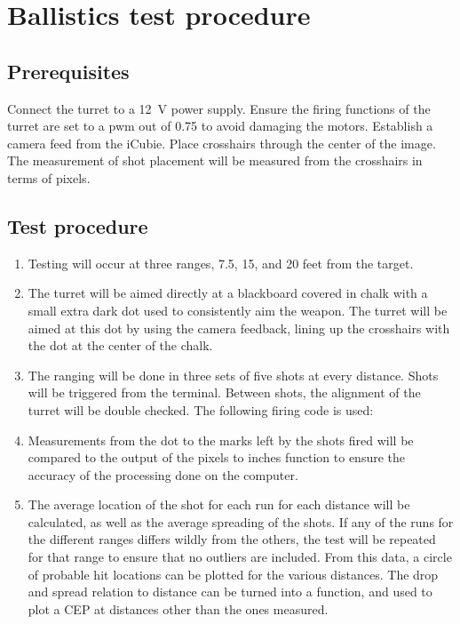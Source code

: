﻿\section{Ballistics test procedure}

\subsection{Prerequisites}
Connect the turret to a \SI{12}{\volt} power supply. Ensure the firing functions of the turret are set to a pwm out of 0.75 to avoid damaging the motors. Establish a camera feed from the iCubie. Place crosshairs through the center of the image. The measurement of shot placement will be measured from the crosshairs in terms of pixels.

\subsection{Test procedure}
\begin{enumerate}
\item Testing will occur at three ranges, 7.5, 15, and 20 feet from the target. 

\item The turret will be aimed directly at a blackboard covered in chalk with a small extra dark dot used to consistently aim the weapon. The turret will be aimed at this dot by using the camera feedback, lining up the crosshairs with the dot at the center of the chalk.

\item The ranging will be done in three sets of five shots at every distance. Shots will be triggered from the terminal. Between shots, the alignment of the turret will be double checked. The following firing code is used:
%       

\item Measurements from the dot to the marks left by the shots fired will be compared to the output of the pixels to inches function to ensure the accuracy of the processing done on the computer. 

\item The average location of the shot for each run for each distance will be calculated, as well as the average spreading of the shots. If any of the runs for the different ranges differs wildly from the others, the test will be repeated for that range to ensure that no outliers are included. From this data, a circle of probable hit locations can be plotted for the various distances. The drop and spread relation to distance can be turned into a function, and used to plot a CEP at distances other than the ones measured.
\end{enumerate}
